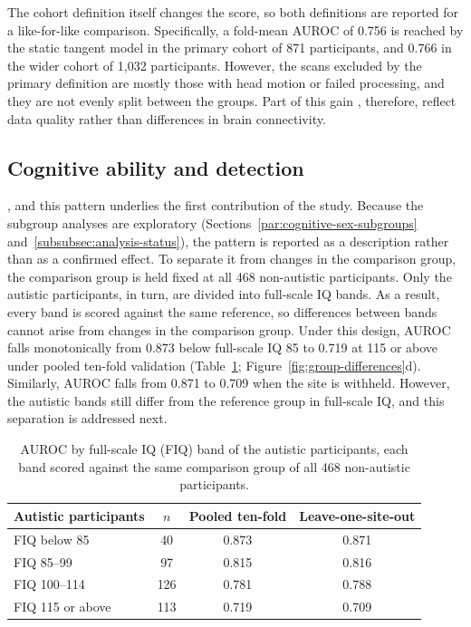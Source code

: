 The cohort definition itself changes the score, so both definitions are reported for a
like-for-like comparison. Specifically, a fold-mean AUROC of 0.756 is reached by the static
tangent model in the primary cohort of 871 participants, and 0.766 in the wider cohort of
1,032 participants. However, the scans excluded by the primary definition are mostly those with
head motion or failed processing, and they are not evenly split between the groups. Part of
this gain , therefore, reflect data quality rather than differences in brain
connectivity.

\subsection{Cognitive ability and detection}
\label{subsec:results-cognitive-ability}

, and
this pattern underlies the first contribution of the study. Because the subgroup analyses
are exploratory (Sections~\ref{par:cognitive-sex-subgroups} and~\ref{subsubsec:analysis-status}), the pattern is reported as
a description rather than as a confirmed effect. To separate it from changes in the
comparison group, the comparison group is held fixed at all 468 non-autistic participants.
Only the autistic participants, in turn, are divided into full-scale IQ bands. As a result, every band is
scored against the same reference, so differences between bands cannot arise from changes
in the comparison group. Under this design, AUROC falls monotonically from 0.873 below
full-scale IQ 85 to 0.719 at 115 or above under pooled ten-fold validation
(Table~\ref{tab:iq-bands}; Figure~\ref{fig:group-differences}d). Similarly, AUROC falls from
0.871 to 0.709 when the site is withheld. However, the autistic bands still differ from the
reference group in full-scale IQ, and this separation is addressed next.

\begin{table}[t]
\centering
\caption{AUROC by full-scale IQ (FIQ) band of the autistic participants, each band scored
against the same comparison group of all 468 non-autistic participants.}
\label{tab:iq-bands}
\small
\begin{tabular}{@{}lccc@{}}
\toprule
Autistic participants & $n$ & Pooled ten-fold & Leave-one-site-out \\
\midrule
FIQ below 85 & 40 & 0.873 & 0.871 \\
FIQ 85--99 & 97 & 0.815 & 0.816 \\
FIQ 100--114 & 126 & 0.781 & 0.788 \\
FIQ 115 or above & 113 & 0.719 & 0.709 \\
\bottomrule
\end{tabular}
\end{table}

